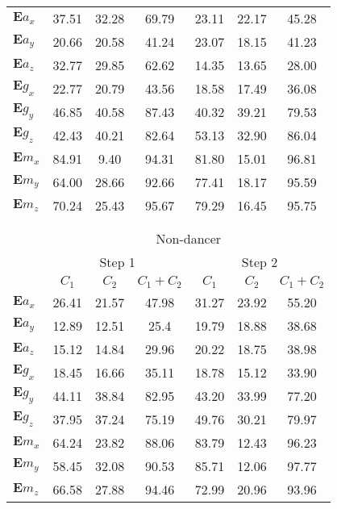 \documentclass{sigchi}
\begin{document}
\begin{table}
\begin{tabular}{l c c c c c c }
$\boldsymbol{E} a_{x}$ & 37.51 & 32.28 & 69.79 & 23.11 & 22.17 & 45.28 \\
$\boldsymbol{E} a_{y}$ & 20.66 & 20.58 & 41.24 & 23.07 & 18.15 & 41.23 \\
$\boldsymbol{E} a_{z}$ & 32.77 & 29.85 & 62.62 & 14.35 & 13.65 & 28.00 \\
$\boldsymbol{E} g_{x}$ & 22.77 & 20.79 & 43.56 & 18.58 & 17.49 & 36.08 \\
$\boldsymbol{E} g_{y}$ & 46.85 & 40.58 & 87.43 & 40.32 & 39.21 & 79.53 \\
$\boldsymbol{E} g_{z}$ & 42.43 & 40.21 & 82.64 & 53.13 & 32.90 & 86.04 \\
$\boldsymbol{E} m_{x}$ & 84.91 & 9.40 & 94.31 & 81.80 & 15.01 & \cellcolor{blue!25}96.81 \\
$\boldsymbol{E} m_{y}$ & 64.00 & 28.66 & 92.66 & 77.41 & 18.17 & 95.59 \\
$\boldsymbol{E} m_{z}$ & 70.24 & 25.43 & \cellcolor{blue!25}95.67 & 79.29 & 16.45 & 95.75  \\


\\
\\
& \multicolumn{6}{c}{Non-dancer} \\
\cmidrule(r){2-7}

& \multicolumn{3}{c}{Step 1} & \multicolumn{3}{c}{Step 2}\\
\cmidrule(lr){2-4} \cmidrule(lr){5-7}
     & $C_1$  & $C_2$  & $C_1+C_2$  & $C_1$  & $C_2$  & $C_1+C_2$  \\
\midrule

$\boldsymbol{E} a_{x}$ & 26.41 & 21.57 & 47.98 & 31.27 & 23.92 & 55.20  \\
$\boldsymbol{E} a_{y}$ & 12.89 & 12.51 & 25.4 & 19.79 & 18.88 & 38.68 \\
$\boldsymbol{E} a_{z}$ & 15.12 & 14.84 & 29.96 & 20.22 & 18.75 & 38.98 \\
$\boldsymbol{E} g_{x}$ & 18.45 & 16.66 & 35.11 & 18.78 & 15.12 & 33.90 \\
$\boldsymbol{E} g_{y}$ & 44.11 & 38.84 & 82.95 & 43.20 & 33.99 & 77.20 \\
$\boldsymbol{E} g_{z}$ & 37.95 & 37.24 & 75.19 & 49.76 & 30.21 & 79.97 \\
$\boldsymbol{E} m_{x}$ & 64.24 & 23.82 & 88.06 & 83.79 & 12.43 & 96.23 \\
$\boldsymbol{E} m_{y}$ & 58.45 & 32.08 & 90.53 & 85.71 & 12.06 & \cellcolor{blue!25}97.77 \\
$\boldsymbol{E} m_{z}$ & 66.58 & 27.88 & \cellcolor{blue!25}94.46 & 72.99 & 20.96 & 93.96 \\


\end{tabular}
\end{table}
\end{document}
